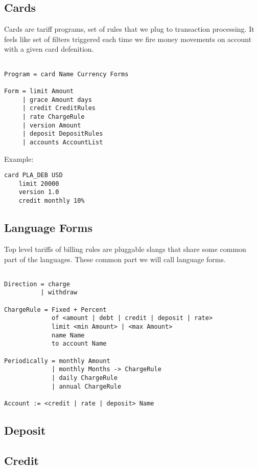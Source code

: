 \newpage
\subsection{Cards}

Cards are tariff programs, set of rules that we plug to transaction processing.
It feels like set of filters triggered each time we fire money
movements on account with a given card defenition.

\vspace{1\baselineskip}
\begin{lstlisting}[caption=BNF]

Program = card Name Currency Forms

Form = limit Amount
     | grace Amount days
     | credit CreditRules
     | rate ChargeRule
     | version Amount
     | deposit DepositRules
     | accounts AccountList
\end{lstlisting}
\vspace{1\baselineskip}

Example:

\vspace{1\baselineskip}
\begin{lstlisting}[caption=credit.card]
    card PLA_DEB USD
    limit 20000
    version 1.0
    credit monthly 10%
\end{lstlisting}
\vspace{1\baselineskip}

\newpage
\subsection{Language Forms}

Top level tariffs of billing rules are pluggable slangs that
share some common part of the languages. These common part we will
call language forms.

\vspace{1\baselineskip}
\begin{lstlisting}[caption=BNF]

Direction = charge 
          | withdraw

ChargeRule = Fixed + Percent
             of <amount | debt | credit | deposit | rate>
             limit <min Amount> | <max Amount>
             name Name
             to account Name

Periodically = monthly Amount 
             | monthly Months -> ChargeRule
             | daily ChargeRule
             | annual ChargeRule

Account := <credit | rate | deposit> Name

\end{lstlisting}
\vspace{1\baselineskip}

\subsection{Deposit}

\subsection{Credit}

